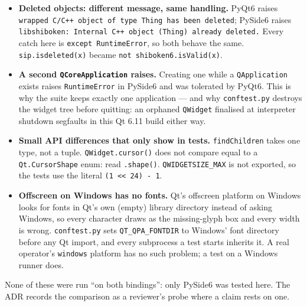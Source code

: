 \begin{itemize}
    the packaging bug that produced a bundle that looked complete and failed at render time.
  \item \textbf{Deleted objects: different message, same handling.} PyQt6 raises
    \texttt{wrapped C/\allowbreak{}C++ object of type Thing has been deleted}; PySide6 raises
    \texttt{libshiboken: Internal C++ object (Thing) already deleted.} Every catch here is
    \texttt{except RuntimeError}, so both behave the same. \texttt{sip.isdeleted(x)} became
    \texttt{not shiboken6.isValid(x)}.
  \item \textbf{A second \texttt{QCoreApplication} raises.} Creating one while a \texttt{QApplication}
    exists raises \texttt{RuntimeError} in PySide6 and was tolerated by PyQt6. This is why the suite keeps
    exactly one application --- and why \texttt{conftest.py} destroys the widget tree before quitting: an
    orphaned \texttt{QWidget} finalised at interpreter shutdown segfaults in this Qt 6.11 build either way.
  \item \textbf{Small API differences that only show in tests.} \texttt{findChildren} takes one type, not a
    tuple. \texttt{QWidget.cursor()} does not compare equal to a \texttt{Qt.CursorShape} enum: read
    \texttt{.shape()}. \texttt{QWIDGETSIZE\_MAX} is not exported, so the tests use the literal
    \texttt{(1 << 24) - 1}.
  \item \textbf{Offscreen on Windows has no fonts.} Qt's offscreen platform on Windows looks for fonts in
    Qt's own (empty) library directory instead of asking Windows, so every character draws as the
    missing-glyph box and every width is wrong. \texttt{conftest.py} sets \texttt{QT\_QPA\_FONTDIR} to
    Windows' font directory before any Qt import, and every subprocess a test starts inherits it. A real
    operator's \texttt{windows} platform has no such problem; a test on a Windows runner does.
\end{itemize}

None of these were run ``on both bindings'': only PySide6 was tested here. The ADR records the
comparison as a reviewer's probe where a claim rests on one.

